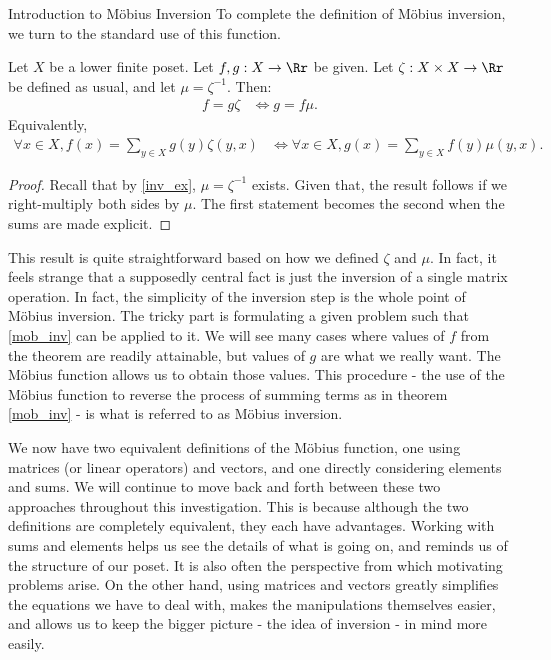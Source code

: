 \documentclass[12pt]{pom_thesis}
\begin{document}
\begin{chapter}{Introduction to M\"obius Inversion}
To complete the definition of M\"obius inversion, we turn to the standard use of this function. 
\begin{thm}\label{mob_inv}
Let $X$ be a lower finite poset. Let $f,g:X \rightarrow \Rr$ be given. Let $\zeta:X \times X \rightarrow \Rr$ be defined as usual, and let $\mu = \zeta^{-1}$. Then:
\begin{align*}
f = g \zeta & \iff g = f \mu.
\end{align*}
Equivalently,
\begin{align*}
\forall x \in X, f(x) = \sum_{y \in X} g(y)\zeta(y,x) &\iff \forall x \in X, g(x) = \sum_{y \in X} f(y)\mu(y,x).
\end{align*}
\end{thm}
\begin{proof}
Recall that by \ref{inv_ex}, $\mu = \zeta^{-1}$ exists. Given that, the result follows if we right-multiply both sides by $\mu$. The first statement becomes the second when the sums are made explicit.
\end{proof}

This result is quite straightforward based on how we defined $\zeta$ and $\mu$. In fact, it feels strange that a supposedly central fact is just the inversion of a single matrix operation. In fact, the simplicity of the inversion step is the whole point of M\"obius inversion. The tricky part is formulating a given problem such that \ref{mob_inv} can be applied to it. We will see many cases where values of $f$ from the theorem are readily attainable, but values of $g$ are what we really want. The M\"obius function allows us to obtain those values. This procedure - the use of the M\"obius function to reverse the process of summing terms as in theorem \ref{mob_inv} - is what is referred to as M\"obius inversion.

We now have two equivalent definitions of the M\"obius function, one using matrices (or linear operators) and vectors, and one directly considering elements and sums. We will continue to move back and forth between these two approaches throughout this investigation. This is because although the two definitions are completely equivalent, they each have advantages. Working with sums and elements helps us see the details of what is going on, and reminds us of the structure of our poset. It is also often the perspective from which motivating problems arise. On the other hand, using matrices and vectors greatly simplifies the equations we have to deal with, makes the manipulations themselves easier, and allows us to keep the bigger picture - the idea of inversion - in mind more easily. 

\end{chapter}
\end{document}
